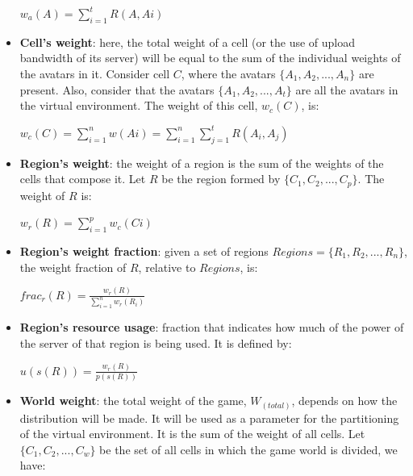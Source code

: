 \begin{itemize}
		\begin{center}
			$\displaystyle w_a(A) = \sum_{i=1}^{t} R(A,Ai)$
		\end{center}
				
	\item \textbf{Cell's weight}: here, the total weight of a cell (or the use of upload bandwidth of its server) will be equal to the sum of the individual weights of the avatars in it. Consider cell $C$, where the avatars $\{A_1, A_2, ..., A_n\}$ are present. Also, consider that the avatars $\{A_1, A_2, ..., A_t\}$ are all the avatars in the virtual environment. The weight of this cell, $w_c(C)$, is:
	
		\begin{center}		
			$\displaystyle w_c(C) = \sum_{i=1}^{n} w(Ai) = \sum_{i=1}^{n} \sum_{j=1}^{t} R(A_i,A_j)$
		\end{center}
		
	\item \textbf{Region's weight}: the weight of a region is the sum of the weights of the cells that compose it. Let $R$ be the region formed by $\{C_1, C_2, ..., C_p\}$. The weight of $R$ is:
	
		\begin{center}
			$\displaystyle w_r(R) = \sum_{i=1}^{p} w_c(Ci)$
		\end{center}
		
		\item \textbf{Region's weight fraction}: given a set of regions $Regions  = \{R_1, R_2, ..., R_n\}$, the weight fraction of $R$, relative to $Regions$, is:
	
		\begin{center}
			$frac_r(R) = \frac{\displaystyle w_r(R)}{\displaystyle\sum_{i=1}^{n} w_r(R_i)}$
		\end{center}
		
	\item \textbf{Region's resource usage}: fraction that indicates how much of the power of the server of that region is being used. It is defined by:
	
		\begin{center}
			$u(s(R)) = \frac{\displaystyle w_r(R)}{\displaystyle p(s(R))}$	
		\end{center}
		
	\item \textbf{World weight}: the total weight of the game, $W_(total)$, depends on how the distribution will be made. It will be used as a parameter for the partitioning of the virtual environment. It is the sum of the weight of all cells. Let $\{C_1, C_2, ..., C_w\}$ be the set of all cells in which the game world is divided, we have:
	

\end{itemize}
